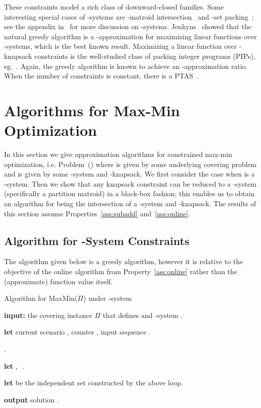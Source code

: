\documentclass[11pt,letterpaper]{article}
\def\cov{\ensuremath{\Pi}\xspace}
\def\mmp{{\sf MaxMin(\cov)}\xspace}
\begin{document}
These constraints model a rich class of downward-closed families. Some interesting special cases of -systems are
-matroid intersection~\cite{Schr-book} and -set packing~\cite{HS89,B00}; see the appendix in~\cite{CCPV07} for
more discussion on -systems. Jenkyns~\cite{J76} showed that the natural greedy algorithm is a -approximation for
maximizing linear functions over -systems, which is the best known result. Maximizing a linear function over
-knapsack constraints is the well-studied class of packing integer programs (PIPs), eg.~\cite{S99}. Again, the
greedy algorithm is known to achieve an -approximation ratio. When the number of constraints  is constant,
there is a PTAS~\cite{CK04-multidim}.




\section{Algorithms for Max-Min Optimization}
\label{sec:max-min}

In this section we give approximation algorithms for constrained max-min optimization, i.e. Problem~(\maxf) where 
is given by some underlying covering problem and  is given by some -system and -knapsack. We first consider
the case when  is a  -system. Then we show that any knapsack constraint can be reduced to a -system
(specifically a partition matroid) in a black-box fashion; this enables us to obtain an algorithm for  being the
intersection of a  -system and -knapsack. The results of this section assume Properties~\ref{ass:subadd}
and~\ref{ass:online}.

\subsection{Algorithm for -System Constraints}
The algorithm given below is a greedy algorithm, however it is relative to the objective of the online algorithm
 from Property~\ref{ass:online} rather than the (approximate) function value itself.
\begin{algorithm}
  \caption{Algorithm for \mmp under -system}
  \begin{algorithmic}[1]
\STATE \textbf{input:} the covering instance \cov that defines  and -system .

\STATE \textbf{let} current scenario , counter , input sequence .


    \STATE .

    \STATE \textbf{let} ,\,\, .

    \ENDWHILE

    \STATE \label{step:mm} \textbf{let}  be the independent set constructed by the above loop.

    \STATE \textbf{output} solution .
\end{algorithmic}
\end{algorithm}
\end{document}
